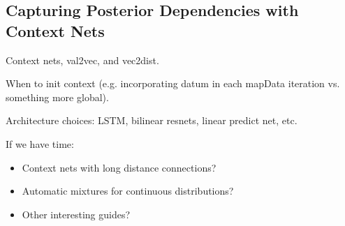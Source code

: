 \subsection{Capturing Posterior Dependencies with Context Nets}

Context nets, val2vec, and vec2dist.

When to init context (e.g. incorporating datum in each mapData iteration vs. something more global).

Architecture choices: LSTM, bilinear resnets, linear predict net, etc.

If we have time:
\begin{itemize}
\item{Context nets with long distance connections?}
\item{Automatic mixtures for continuous distributions?}
\item{Other interesting guides?}
\end{itemize}


